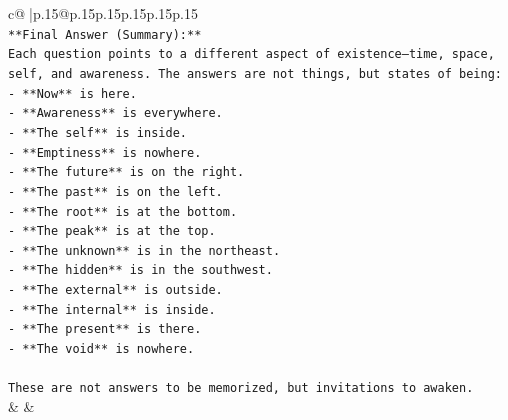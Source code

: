\documentclass{article}
\begin{document}
{\begin{supertabular}{c@{$\;$}|p{.15\linewidth}@{}p{.15\linewidth}p{.15\linewidth}p{.15\linewidth}p{.15\linewidth}p{.15\linewidth}}
{{{\\ 
\texttt{**Final Answer (Summary):**  } \\
\texttt{Each question points to a different aspect of existence—time, space, self, and awareness. The answers are not things, but states of being:  } \\
\texttt{{-} **Now** is here.  } \\
\texttt{{-} **Awareness** is everywhere.  } \\
\texttt{{-} **The self** is inside.  } \\
\texttt{{-} **Emptiness** is nowhere.  } \\
\texttt{{-} **The future** is on the right.  } \\
\texttt{{-} **The past** is on the left.  } \\
\texttt{{-} **The root** is at the bottom.  } \\
\texttt{{-} **The peak** is at the top.  } \\
\texttt{{-} **The unknown** is in the northeast.  } \\
\texttt{{-} **The hidden** is in the southwest.  } \\
\texttt{{-} **The external** is outside.  } \\
\texttt{{-} **The internal** is inside.  } \\
\texttt{{-} **The present** is there.  } \\
\texttt{{-} **The void** is nowhere.  } \\
\\ 
\texttt{These are not answers to be memorized, but invitations to awaken.} \\
            }
        }
    }
    & & \\ \\


\end{supertabular}}
\end{document}
